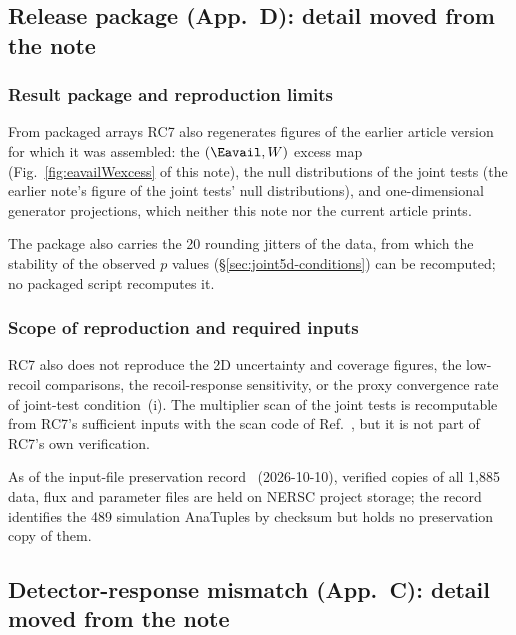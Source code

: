 \subsection{Release package (App.~D): detail moved from the note}

\subsubsection{Result package and reproduction limits}

From packaged arrays RC7 also regenerates figures of the earlier article version for which it was assembled: the $(\Eavail,W)$ excess map (Fig.~\ref{fig:eavailWexcess} of this note), the null distributions of the joint tests (the earlier note's figure of the joint tests' null distributions), and one-dimensional generator projections, which neither this note nor the current article prints.

The package also carries the 20 rounding jitters of the data, from which the stability of the observed $p$ values (\S\ref{sec:joint5d-conditions}) can be recomputed; no packaged script recomputes it.

\subsubsection{Scope of reproduction and required inputs}

RC7 also does not reproduce the 2D uncertainty and coverage figures, the low-recoil comparisons, the recoil-response sensitivity, or the proxy convergence rate of joint-test condition~(i). The multiplier scan of the joint tests is recomputable from RC7's sufficient inputs with the scan code of Ref.~\cite{JointTestKappa2026}, but it is not part of RC7's own verification.

As of the input-file preservation record~\cite{AnaTuplePreservation2026} (2026-10-10), verified copies of all 1,885 data, flux and parameter files are held on NERSC project storage; the record identifies the 489 simulation AnaTuples by checksum but holds no preservation copy of them.

\subsection{Detector-response mismatch (App.~C): detail moved from the note}

